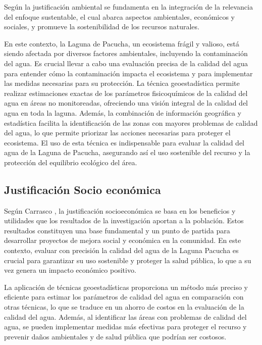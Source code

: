 Según \textcite{book:2636572} la justificación ambiental se fundamenta en la integración de la relevancia del enfoque sustentable, el cual abarca aspectos ambientales, económicos y sociales, y promueve la sostenibilidad de los recursos naturales.

En este contexto, la Laguna de Pacucha, un ecosistema frágil y valioso, está siendo afectada por diversos factores ambientales, incluyendo la contaminación del agua. Es crucial llevar a cabo una evaluación precisa de la calidad del agua para entender cómo la contaminación impacta el ecosistema y para implementar las medidas necesarias para su protección. La técnica geoestadística permite realizar estimaciones exactas de los parámetros fisicoquímicos de la calidad del agua en áreas no monitoreadas, ofreciendo una visión integral de la calidad del agua en toda la laguna. Además, la combinación de información geográfica y estadística facilita la identificación de las zonas con mayores problemas de calidad del agua, lo que permite priorizar las acciones necesarias para proteger el ecosistema. El uso de esta técnica es indispensable para evaluar la calidad del agua de la Laguna de Pacucha, asegurando así el uso sostenible del recurso y la protección del equilibrio ecológico del área.

\subsection{Justificación Socio económica}

Según Carrasco \cite{carrasco2005metodologia}, la justificación socioeconómica se basa en los beneficios y utilidades que los resultados de la investigación aportan a la población. Estos resultados constituyen una base fundamental y un punto de partida para desarrollar proyectos de mejora social y económica en la comunidad. En este contexto, evaluar con precisión la calidad del agua de la Laguna Pacucha es crucial para garantizar su uso sostenible y proteger la salud pública, lo que a su vez genera un impacto económico positivo.

La aplicación de técnicas geoestadísticas proporciona un método más preciso y eficiente para estimar los parámetros de calidad del agua en comparación con otras técnicas, lo que se traduce en un ahorro de costos en la evaluación de la calidad del agua. Además, al identificar las áreas con problemas de calidad del agua, se pueden implementar medidas más efectivas para proteger el recurso y prevenir daños ambientales y de salud pública que podrían ser costosos.




